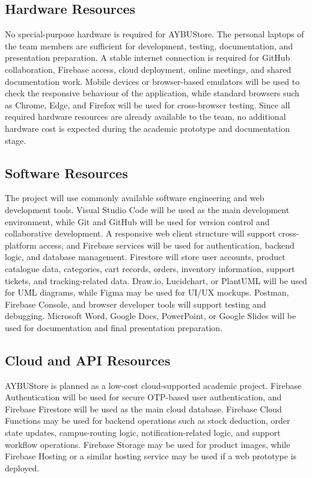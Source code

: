 \documentclass[11pt,a4paper]{article}
\begin{document}
\subsection{Hardware Resources}
 
No special-purpose hardware is required for AYBUStore. The personal laptops
of the team members are sufficient for development, testing, documentation,
and presentation preparation. A stable internet connection is required for
GitHub collaboration, Firebase access, cloud deployment, online meetings,
and shared documentation work. Mobile devices or browser-based emulators
will be used to check the responsive behaviour of the application, while
standard browsers such as Chrome, Edge, and Firefox will be used for
cross-browser testing. Since all required hardware resources are already
available to the team, no additional hardware cost is expected during the
academic prototype and documentation stage.
 
\subsection{Software Resources}
 
The project will use commonly available software engineering and web
development tools. Visual Studio Code will be used as the main development
environment, while Git and GitHub will be used for version control and
collaborative development. A responsive web client structure will support
cross-platform access, and Firebase services will be used for authentication,
backend logic, and database management. Firestore will store user accounts,
product catalogue data, categories, cart records, orders, inventory
information, support tickets, and tracking-related data. Draw.io, Lucidchart,
or PlantUML will be used for UML diagrams, while Figma may be used for UI/UX
mockups. Postman, Firebase Console, and browser developer tools will support
testing and debugging. Microsoft Word, Google Docs, PowerPoint, or Google
Slides will be used for documentation and final presentation preparation.
 
\subsection{Cloud and API Resources}
 
AYBUStore is planned as a low-cost cloud-supported academic project. Firebase
Authentication will be used for secure OTP-based user authentication, and
Firebase Firestore will be used as the main cloud database. Firebase Cloud
Functions may be used for backend operations such as stock deduction, order
state updates, campus-routing logic, notification-related logic, and support
workflow operations. Firebase Storage may be used for product images, while
Firebase Hosting or a similar hosting service may be used if a web prototype
is deployed.
 
\end{document}
